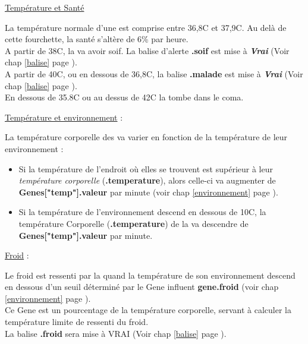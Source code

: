 \documentclass[french]{report}
\newlength{\du}\fi
\begin{document}
\begin{center}
	\underline{Température et Santé}
\end{center}
La température normale d'une \CoCiX est comprise entre 36,8\degres C et 37,9\degres C. Au delà de cette fourchette, la santé s'altère de 6\% par heure.\\
A partir de 38\degres C, la \CoCiX va avoir soif. La balise d'alerte \textbf{.soif} est mise à \textbf{\textit{Vrai}} (Voir chap \ref{balise} page \pageref{balise}).\\
A partir de 40\degres C, ou en dessous de 36,8\degres C, la balise \textbf{.malade} est mise à \textbf{\textit{Vrai}} (Voir chap \ref{balise} page \pageref{balise}).\\
En dessous de 35.8\degres C ou au dessus de 42\degres C la \CoCiX tombe dans le coma.

\begin{center}
	\underline{Température et environnement} :
\end{center}
 La température corporelle des \CoCiX va varier en fonction de la température de leur environnement :\\
\begin{itemize}
	\item Si la température de l'endroit où elles se trouvent est supérieur à leur \textit{température corporelle} (\textbf{.temperature}), alors celle-ci va augmenter de \textbf{Genes["temp"].valeur} par minute (voir chap \ref{environnement} page \pageref{environnement}).\\
	
	\item Si la température de l'environnement descend en dessous de 10\degres C, la température Corporelle (\textbf{.temperature}) de la \CoCiX va descendre de \textbf{Genes["temp"].valeur} par minute.
\end{itemize}

\begin{center}
	\underline{Froid} :\label{froid}
\end{center}
Le froid est ressenti par la \CoCiX quand la température de son environnement descend en dessous d'un seuil déterminé par le Gene influent \textbf{gene.froid} (voir chap \ref{environnement} page \pageref{environnement}).\\

Ce Gene est un pourcentage de la température corporelle, servant à calculer la température limite de ressenti du froid.\\
La balise \textbf{.froid} sera mise à VRAI (Voir chap \ref{balise} page \pageref{balise}).\\
\end{document}
